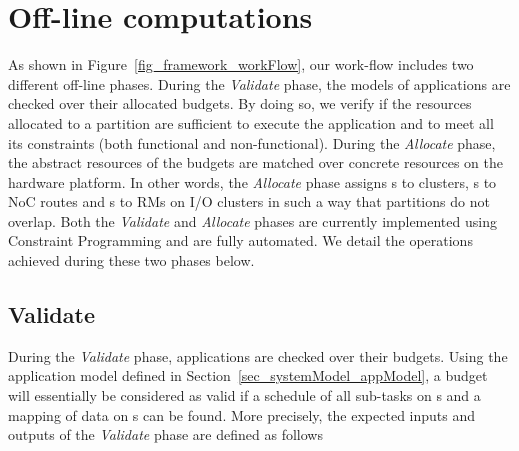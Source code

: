 \documentclass[main.tex]{subfiles}
\begin{document}
\section{Off-line computations}
\label{sec_framework_offLineComputations}
As shown in Figure~\ref{fig_framework_workFlow}, our work-flow includes two different off-line phases. During the \emph{Validate} phase, the models of applications are checked over their allocated budgets. By doing so, we verify if the resources allocated to a partition are sufficient to execute the application and to meet all its constraints (both functional and non-functional). During the \emph{Allocate} phase, the abstract resources of the budgets are matched over concrete resources on the hardware platform. In other words, the \emph{Allocate} phase assigns \PN{}s to clusters, \PC{}s to NoC routes and \ION{}s to RMs on I/O clusters in such a way that partitions do not overlap. Both the \emph{Validate} and \emph{Allocate} phases are currently implemented using Constraint Programming and are fully automated. We detail the operations achieved during these two phases below.

\subsection{Validate}
During the \emph{Validate} phase, applications are checked over their budgets. Using the application model defined in Section~\ref{sec_systemModel_appModel}, a budget will essentially be considered as valid if a schedule of all sub-tasks on \PN{}s and a mapping of data on \PC{}s can be found. More precisely, the expected inputs and outputs of the \emph{Validate} phase are defined as follows
\end{document}
